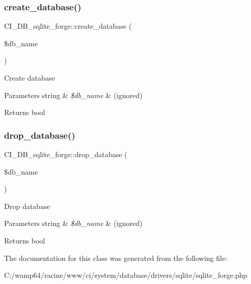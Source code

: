 \subsubsection{\texorpdfstring{create\+\_\+database()}{create\_database()}}
{\footnotesize\ttfamily C\+I\+\_\+\+D\+B\+\_\+sqlite\+\_\+forge\+::create\+\_\+database (\begin{DoxyParamCaption}\item[{}]{\$db\+\_\+name }\end{DoxyParamCaption})}

Create database


\begin{DoxyParams}[1]{Parameters}
string & {\em \$db\+\_\+name} & (ignored) \\
\hline
\end{DoxyParams}
\begin{DoxyReturn}{Returns}
bool 
\end{DoxyReturn}
\mbox{\label{class_c_i___d_b__sqlite__forge_a2a78fe3cc9de111bd2aa8d7cc207acf8}} 
\subsubsection{\texorpdfstring{drop\+\_\+database()}{drop\_database()}}
{\footnotesize\ttfamily C\+I\+\_\+\+D\+B\+\_\+sqlite\+\_\+forge\+::drop\+\_\+database (\begin{DoxyParamCaption}\item[{}]{\$db\+\_\+name }\end{DoxyParamCaption})}

Drop database


\begin{DoxyParams}[1]{Parameters}
string & {\em \$db\+\_\+name} & (ignored) \\
\hline
\end{DoxyParams}
\begin{DoxyReturn}{Returns}
bool 
\end{DoxyReturn}


The documentation for this class was generated from the following file\+:\begin{DoxyCompactItemize}
\item 
C\+:/wamp64/racine/www/ci/system/database/drivers/sqlite/sqlite\+\_\+forge.\+php\end{DoxyCompactItemize}
